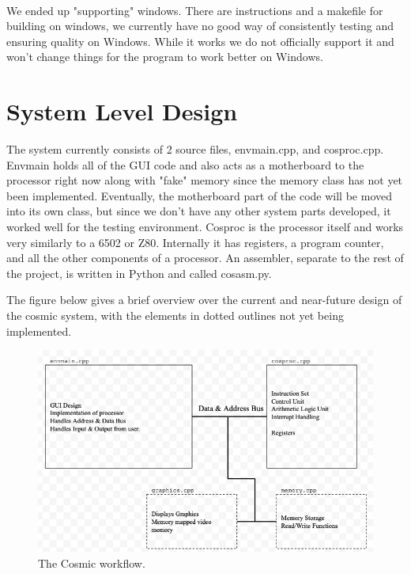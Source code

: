\documentclass[conference]{IEEEtran}
\begin{document}
\\

We ended up "supporting" windows. There are instructions and a makefile for building on windows, we currently have no good way of consistently testing and ensuring quality on Windows. While it works we do not officially support it and won't change things for the program to work better on Windows. 


\section{System Level Design}

The system currently consists of 2 source files, envmain.cpp, and cosproc.cpp. Envmain holds all of the GUI code and also acts as a motherboard to the processor right now along with "fake" memory since the memory class has not yet been implemented. Eventually, the motherboard part of the code will be moved into its own class, but since we don't have any other system parts developed, it worked well for the testing environment. Cosproc is the processor itself and works very similarly to a 6502 or Z80. Internally it has registers, a program counter, and all the other components of a processor. An assembler, separate to the rest of the project, is written in Python and called cosasm.py. 

The figure below gives a brief overview over the current and near-future design of the cosmic system, with the elements in dotted outlines not yet being implemented.

\begin{figure}[h!]
	\includegraphics[width=\linewidth]{SystemDesign.png}
	\caption{The Cosmic workflow.}
	\label{fig:The Cosmic Workflow}
\end{figure}
\end{document}
